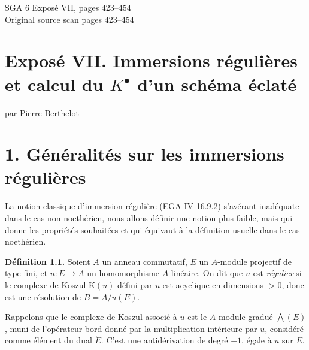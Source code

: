 \documentclass[11pt]{article}
\newcommand{\Tor}{\operatorname{Tor}}
\newcommand{\Spec}{\operatorname{Spec}}
\providecommand{\rad}{\operatorname{rad}}
\providecommand{\Tor}{\operatorname{Tor}}
\providecommand{\Ker}{\operatorname{Ker}}
\providecommand{\cO}{\mathcal O}
\begin{document}
\providecommand{\Kosz}{\mathrm K}
\providecommand{\Proj}{\operatorname{Proj}}
\providecommand{\Sym}{\operatorname{Sym}}
\providecommand{\gr}{\operatorname{gr}}
\providecommand{\Tor}{\operatorname{Tor}}
\providecommand{\Spec}{\operatorname{Spec}}
\providecommand{\Imf}{\operatorname{Im}}
\providecommand{\Ker}{\operatorname{Ker}}
\providecommand{\Id}{\operatorname{Id}}
\providecommand{\rad}{\operatorname{rad}}
\providecommand{\cO}{\mathcal O}
\providecommand{\cS}{\mathcal S}
\providecommand{\cJ}{\mathcal J}
\providecommand{\cN}{\mathcal N}
\providecommand{\bfP}{\mathbf P}
\providecommand{\bfA}{\mathbf A}

\begin{center}
{\Large SGA 6 Exposé VII, pages 423--454}\\[0.4em]
{\large Original source scan pages 423--454}
\end{center}


\section*{Exposé VII. Immersions régulières et calcul du \texorpdfstring{$K^\bullet$}{K} d'un schéma éclaté}
\begin{center}
par Pierre Berthelot
\end{center}

\section*{1. Généralités sur les immersions régulières}

La notion classique d'immersion régulière (EGA IV 16.9.2) s'avérant inadéquate dans le cas non noethérien, nous allons définir une notion plus faible, mais qui donne les propriétés souhaitées et qui équivaut à la définition usuelle dans le cas noethérien.

\textbf{Définition 1.1.} Soient \(A\) un anneau commutatif, \(E\) un \(A\)-module projectif de type fini, et \(u:E\to A\) un homomorphisme \(A\)-linéaire. On dit que \(u\) est \emph{régulier} si le complexe de Koszul \(\Kosz(u)\) défini par \(u\) est acyclique en dimensions \(>0\), donc est une résolution de \(B=A/u(E)\).

Rappelons que le complexe de Koszul associé à \(u\) est le \(A\)-module gradué \(\bigwedge(E)\), muni de l'opérateur bord donné par la multiplication intérieure par \(u\), considéré comme élément du dual \(\check E\). C'est une antidérivation de degré \(-1\), égale à \(u\) sur \(E\).
\end{document}
